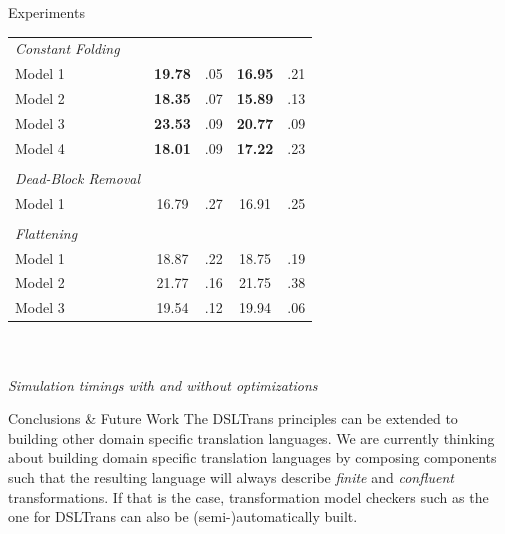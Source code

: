 \documentclass[final,hyperref={pdfpagelabels=false}]{beamer}
\begin{document}
\begin{frame}{}
\begin{columns}[t]
\begin{column}{.385\linewidth}
\begin{block}{Experiments}
\begin{table}[h]
\begin{tabular}{l | c c c c }
             \textit{Constant Folding} & & & & \\
             Model 1 & \textbf{19.78} &.05 & \textbf{16.95} & .21\\
             Model 2 & \textbf{18.35} & .07 &\textbf{ 15.89} & .13\\
             Model 3 &\textbf{ 23.53} & .09 & \textbf{20.77} & .09\\
             Model 4 & \textbf{18.01} & .09 & \textbf{17.22} & .23\\
              & & & & \\
             \textit{Dead-Block Removal} & & & & \\
             Model 1 & 16.79 & .27 & 16.91 & .25\\
              & & & & \\
             \textit{Flattening} & & & & \\
             Model 1 & 18.87 & .22 & 18.75 & .19\\
             Model 2 & 21.77 & .16 & 21.75 & .38\\
             Model 3 & 19.54 & .12 & 19.94 & .06\\
             
             \end{tabular}
             \centering
             ~\\~\\
             \footnotesize \textit{Simulation timings with and without optimizations}
             \end{table}
             \end{block}
             
             
             
             
             \begin{block}{Conclusions \& Future Work}
             \small
        	   The DSLTrans principles can be extended to building other domain
        	   specific translation languages. We are currently thinking about building domain
            specific translation languages by composing components such that the
            resulting language will always describe \emph{finite} and
            \emph{confluent} transformations. If that is the case, transformation
            model checkers such as the one for DSLTrans can also be
            (semi-)automatically built.\vspace{1.1cm}
             \end{block}
             

\end{column}
\end{columns}
\end{frame}
\end{document}
